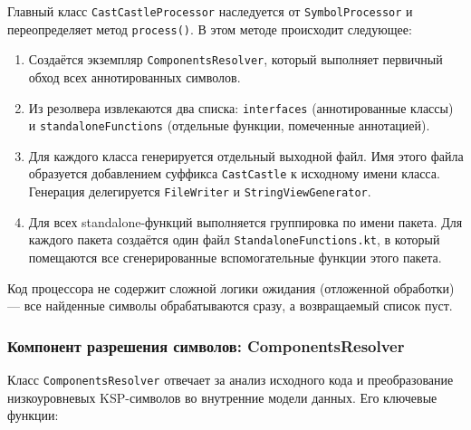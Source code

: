 Главный класс \texttt{CastCastleProcessor} наследуется от \texttt{SymbolProcessor} и переопределяет метод \texttt{process()}. В этом методе происходит следующее:

\begin{enumerate}
    \item Создаётся экземпляр \texttt{ComponentsResolver}, который выполняет первичный обход всех аннотированных символов.
    \item Из резолвера извлекаются два списка: \texttt{interfaces} (аннотированные классы) и \texttt{standaloneFunctions} (отдельные функции, помеченные аннотацией).
    \item Для каждого класса генерируется отдельный выходной файл. Имя этого файла образуется добавлением суффикса \texttt{CastCastle} к исходному имени класса. Генерация делегируется \texttt{FileWriter} и \texttt{StringViewGenerator}.
    \item Для всех standalone-функций выполняется группировка по имени пакета. Для каждого пакета создаётся один файл \texttt{StandaloneFunctions.kt}, в который помещаются все сгенерированные вспомогательные функции этого пакета.
\end{enumerate}

Код процессора не содержит сложной логики ожидания (отложенной обработки) — все найденные символы обрабатываются сразу, а возвращаемый список пуст.

\subsubsection{Компонент разрешения символов: ComponentsResolver}

Класс \texttt{ComponentsResolver} отвечает за анализ исходного кода и преобразование низкоуровневых KSP-символов во внутренние модели данных. Его ключевые функции:

